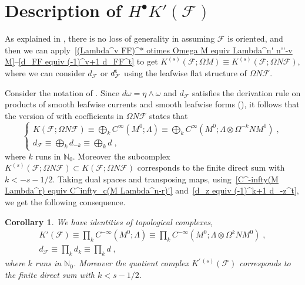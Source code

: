 \documentclass{memo-l}
\theoremstyle{plain}
\newtheorem{cor}[thm]{Corollary}
\theoremstyle{definition}
\theoremstyle{remark}
\newcommand{\N}{\mathbb{N}}
\newcommand{\FF}{\mathcal{F}}
\newcommand{\trans}{{\text{\rm t}}}
\numberwithin{section}{chapter}
\numberwithin{equation}{section}%
\begin{document}
\section{Description of $H^\bullet K'(\FF)$}\label{s: bar H K'(FF)}

As explained in , there is no loss of generality in assuming $\FF$ is oriented, and then we can apply~\eqref{(Lambda^v FF)^* otimes Omega M equiv Lambda^n' n''-v M}--\eqref{d_FF equiv (-1)^v+1 d_FF^t} to get $K^{(s)}(\FF;\Omega M)\equiv K^{(s)}(\FF;\Omega N\FF)$, where we can consider $d_\FF$ or $d_\FF^\trans$ using the leafwise flat structure of $\Omega N\FF$. 

Consider the notation of . Since $d\omega=\eta\wedge\omega$ and $d_\FF$ satisfies the derivation rule on products of smooth leafwise currents and smooth leafwise forms (), it follows that the version of  with coefficients in $\Omega N\FF$ states that
\begin{equation}\label{K(FF Omega N FF) equiv bigoplus_k C^infty(M^0 Lambda)}
\left\{
\begin{gathered}
K(\FF;\Omega N\FF)\equiv\bigoplus_kC^\infty(M^0;\Lambda)
\equiv\bigoplus_kC^\infty(M^0;\Lambda\otimes\Omega^{-k}NM^0)\;,\\
d_\FF\equiv\bigoplus_kd_{-k}\equiv\bigoplus_kd\;,
\end{gathered}
\right.
\end{equation}
where $k$ runs in $\N_0$. Moreover the subcomplex $K^{(s)}(\FF;\Omega N\FF)\subset K(\FF;\Omega N\FF)$ corresponds to the finite direct sum with $k<-s-1/2$. Taking dual spaces and transposing maps, using~\eqref{C^-infty(M Lambda^r) equiv C^infty_c(M Lambda^n-r)'} and~\eqref{d_z equiv (-1)^k+1 d_-z^t}, we get the following consequence.

\begin{cor}\label{c: K'(Lambda FF) equiv prod_k C^-infty(M^0 Lambda)}
We have identities of topological complexes,
\begin{gather*}
K'(\FF)\equiv\prod_kC^{-\infty}(M^0;\Lambda)
\equiv\prod_kC^{-\infty}(M^0;\Lambda\otimes\Omega^kNM^0)\;,\\
d_\FF\equiv\prod_kd_k\equiv\prod_kd\;,
\end{gather*}
where $k$ runs in $\N_0$. Moreover the quotient complex $K^{\prime\,(s)}(\FF)$ corresponds to the finite direct sum with $k<s-1/2$.
\end{cor}
\end{document}
